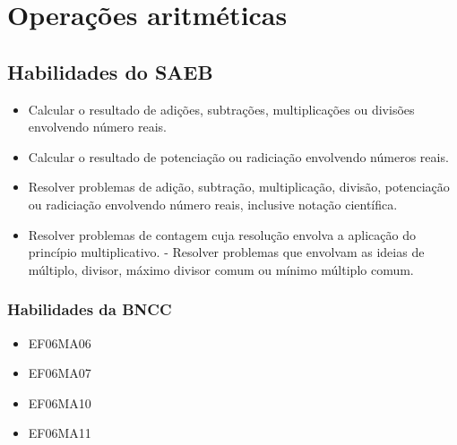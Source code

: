 


\chapter{Operações aritméticas}

\section{Habilidades do SAEB}

\begin{itemize}
\item Calcular o resultado de adições, subtrações,
multiplicações ou divisões envolvendo número reais. 
\item Calcular o
resultado de potenciação ou radiciação envolvendo números reais.
\item Resolver problemas de adição, subtração, multiplicação, divisão,
  potenciação ou radiciação envolvendo número reais, inclusive notação
  científica.
\item Resolver problemas de contagem cuja resolução envolva a aplicação do
  princípio multiplicativo. - Resolver problemas que envolvam as ideias
  de múltiplo, divisor, máximo divisor comum ou mínimo múltiplo comum.
\end{itemize}

\subsection{Habilidades da BNCC}
\begin{itemize} 
\item  EF06MA06
\item EF06MA07
\item EF06MA10
\item EF06MA11
\end{itemize}



